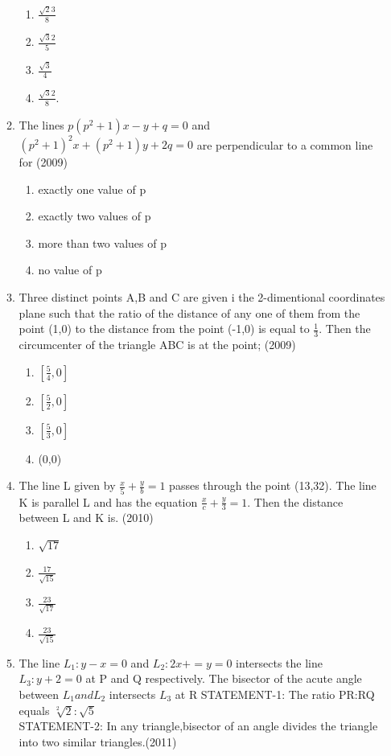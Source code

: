 \documentclass[12pt]{article}
\providecommand{\sbrak}[1]{\ensuremath{{}\left[#1\right]}}
\begin{document}
\begin{enumerate}
\begin{enumerate}
\begin{enumerate}
\item $\frac{\sqrt{2}{3}}{8}$ 
\item $\frac{\sqrt{3}{2}}{5}$ 
\item $\frac{\sqrt{3}}{4}$ 
\item $\frac{\sqrt{3}{2}}{8}$.
\end{enumerate}
\item The lines $p(p^2+1)x-y+q=0$ and $(p^2+1)^2x+(p^2+1)y+2q=0$ are perpendicular to a common line for (2009)
\begin{enumerate}
\item exactly one value of p
\item exactly two values of p
\item more than two values of p
\item no value of p
\end{enumerate}
\item Three distinct points A,B and C are given i the 2-dimentional coordinates plane such that the ratio of the  distance of any one of them from the point (1,0) to the distance from the point (-1,0) is equal to $\frac{1}{3}$. Then the circumcenter of the triangle ABC is at the point; (2009)
\begin{enumerate}
\item $\sbrak{\frac{5}{4} ,0}$ 
\item $\sbrak{\frac{5}{2} ,0}$ 
\item $\sbrak{\frac{5}{3} ,0}$
\item (0,0)
\end{enumerate}
\item The line L given by $\frac{x}{5}+\frac{y}{b}=1$ passes through the point (13,32). The line K is parallel L and has the equation $\frac{x}{c}+\frac{y}{3}=1$. Then the distance between L and K is. (2010)
\begin{enumerate}
\item $\sqrt{17}$  
\item $\frac{17}{\sqrt{15}}$ 
\item $\frac{23}{\sqrt{17}}$ 
\item $\frac{23}{\sqrt{15}}$
\end{enumerate}
\item The line $L_1:y-x=0$ and $L_2: 2x+=y=0$ intersects the line $L_3: y+2=0$ at P and Q respectively. The bisector of the acute angle between $L_1 and L_2$ intersects $L_3$ at R 
STATEMENT-1: The ratio PR:RQ equals $\sqrt[2]{2}:\sqrt{5}$\\
STATEMENT-2: In any triangle,bisector of an angle divides the triangle into two similar triangles.(2011)

\end{enumerate}
\end{enumerate}
\end{document}
